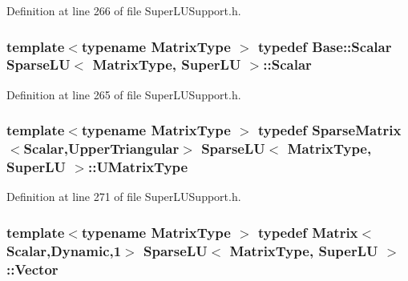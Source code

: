 Definition at line 266 of file Super\-L\-U\-Support.\-h.

\hypertarget{class_sparse_l_u_3_01_matrix_type_00_01_super_l_u_01_4_ae21a6c1f9f89d9345035a47e161d8ac7}{
\subsubsection[{Scalar}]{\setlength{\rightskip}{0pt plus 5cm}template$<$typename Matrix\-Type $>$ typedef {\bf Base\-::\-Scalar} {\bf Sparse\-L\-U}$<$ Matrix\-Type, {\bf Super\-L\-U} $>$\-::{\bf Scalar}\hspace{0.3cm}{\ttfamily [protected]}}}\label{class_sparse_l_u_3_01_matrix_type_00_01_super_l_u_01_4_ae21a6c1f9f89d9345035a47e161d8ac7}


Definition at line 265 of file Super\-L\-U\-Support.\-h.

\hypertarget{class_sparse_l_u_3_01_matrix_type_00_01_super_l_u_01_4_ae359d4920c56a9ac93bc728bc0d04b77}{
\subsubsection[{U\-Matrix\-Type}]{\setlength{\rightskip}{0pt plus 5cm}template$<$typename Matrix\-Type $>$ typedef {\bf Sparse\-Matrix}$<${\bf Scalar},{\bf Upper\-Triangular}$>$ {\bf Sparse\-L\-U}$<$ Matrix\-Type, {\bf Super\-L\-U} $>$\-::{\bf U\-Matrix\-Type}\hspace{0.3cm}{\ttfamily [protected]}}}\label{class_sparse_l_u_3_01_matrix_type_00_01_super_l_u_01_4_ae359d4920c56a9ac93bc728bc0d04b77}


Definition at line 271 of file Super\-L\-U\-Support.\-h.

\hypertarget{class_sparse_l_u_3_01_matrix_type_00_01_super_l_u_01_4_a3cf266f148229c44f36eee6be889db6e}{
\subsubsection[{Vector}]{\setlength{\rightskip}{0pt plus 5cm}template$<$typename Matrix\-Type $>$ typedef {\bf Matrix}$<${\bf Scalar},{\bf Dynamic},1$>$ {\bf Sparse\-L\-U}$<$ Matrix\-Type, {\bf Super\-L\-U} $>$\-::{\bf Vector}\hspace{0.3cm}{\ttfamily [protected]}}}\label{class_sparse_l_u_3_01_matrix_type_00_01_super_l_u_01_4_a3cf266f148229c44f36eee6be889db6e}


